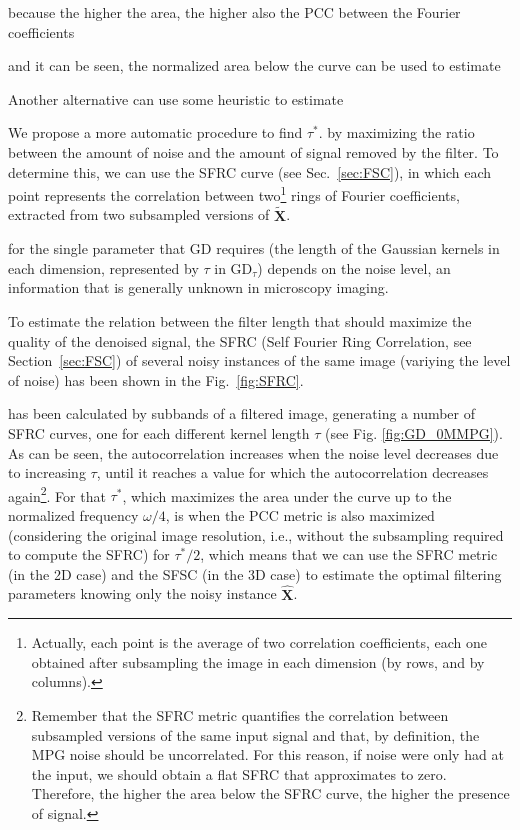 \documentclass{article}
\begin{document}
because the
higher the area, the higher also the PCC between the Fourier
coefficients


and it can be seen, the normalized area below the curve can be used to estimate


Another alternative can use some heuristic to estimate

We propose a more automatic procedure to find $\tau^*$.
by maximizing the ratio between the amount of noise and the amount of
signal removed by the filter. To determine this, we can use the SFRC
curve (see Sec.~\ref{sec:FSC}), in which each point represents the
correlation between two\footnote{Actually, each point is the average
  of two correlation coefficients, each one obtained after subsampling
  the image in each dimension (by rows, and by columns).} rings of
Fourier coefficients, extracted from two subsampled versions of
$\tilde{\mathbf{X}}$.

for the single parameter that GD requires (the length of
the Gaussian kernels in each dimension, represented by $\tau$ in
$\mathrm{GD}_\tau$) depends on the noise level, an information that is
generally unknown in microscopy imaging.

To estimate the relation between the filter length that should
maximize the quality of the denoised signal, the SFRC (Self Fourier
Ring Correlation, see Section~\ref{sec:FSC}) of several noisy
instances of the same image (variying the level of noise) has been
shown in the Fig.~\ref{fig:SFRC}.

has been calculated by subbands of a filtered
image, generating a number of SFRC curves, one for each different
kernel length $\tau$ (see Fig.  \ref{fig:GD_0MMPG}). As can be seen,
the autocorrelation increases when the noise level decreases due to
increasing $\tau$, until it reaches a value for which the
autocorrelation decreases again\footnote{Remember that the SFRC metric
  quantifies the correlation between subsampled versions of the same
  input signal and that, by definition, the MPG noise should be
  uncorrelated. For this reason, if noise were only had at the input,
  we should obtain a flat SFRC that approximates to zero. Therefore,
  the higher the area below the SFRC curve, the higher the presence of
  signal.}. For that $\tau^*$, which maximizes the area under the
curve up to the normalized frequency $\omega/4$, is when the PCC
metric is also maximized (considering the original image resolution,
i.e., without the subsampling required to compute the SFRC) for
$\tau^*/2$, which means that we can use the SFRC metric (in the 2D
case) and the SFSC (in the 3D case) to estimate the optimal filtering
parameters knowing only the noisy instance $\hat{\mathbf{X}}$.
\end{document}
